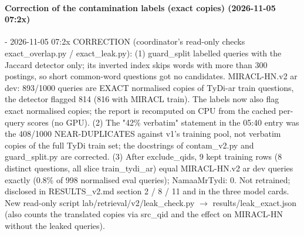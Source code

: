 \paragraph{Correction of the contamination labels (exact copies) (2026-11-05 07:2x)}
{\footnotesize\raggedright
- 2026-11-05 07:2x CORRECTION (coordinator's read-only checks exact\_overlap.py / exact\_leak.py): (1) guard\_split labelled queries with the Jaccard detector only; its inverted index skips words with more than 300 postings, so short common-word questions got no candidates. MIRACL-HN.v2 ar dev: 893/1000 queries are EXACT normalised copies of TyDi-ar train questions, the detector flagged 814 (816 with MIRACL train). The labels now also flag exact normalised copies; the report is recomputed on CPU from the cached per-query scores (no GPU). (2) The "42\% verbatim" statement in the 05:40 entry was the 408/1000 NEAR-DUPLICATES against v1's training pool, not verbatim copies of the full TyDi train set; the docstrings of contam\_v2.py and guard\_split.py are corrected. (3) After exclude\_qids, 9 kept training rows (8 distinct questions, all slice train\_tydi\_ar) equal MIRACL-HN.v2 ar dev queries exactly (0.8\% of 998 normalised eval queries); NamaaMrTydi: 0. Not retrained; disclosed in RESULTS\_v2.md section 2 / 8 / 11 and in the three model cards. New read-only script lab/retrieval/v2/leak\_check.py $\to$ results/leak\_exact.json (also counts the translated copies via src\_qid and the effect on MIRACL-HN without the leaked queries).\par}
